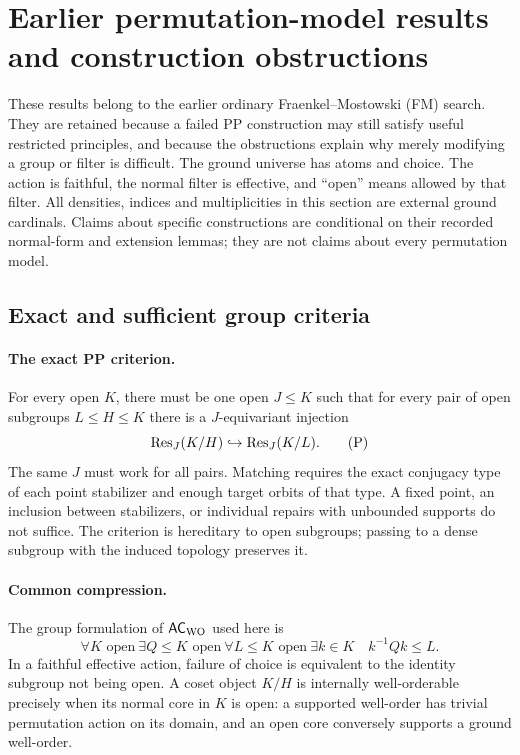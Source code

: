 \section{Earlier permutation-model results and construction obstructions}
\label{sec:earlier}
These results belong to the earlier ordinary Fraenkel--Mostowski (FM) search. They are retained because a failed PP construction may still satisfy useful restricted principles, and because the obstructions explain why merely modifying a group or filter is difficult. The ground universe has atoms and choice. The action is faithful, the normal filter is effective, and ``open'' means allowed by that filter. All densities, indices and multiplicities in this section are external ground cardinals. Claims about specific constructions are conditional on their recorded normal-form and extension lemmas; they are not claims about every permutation model.

\subsection{Exact and sufficient group criteria}
\paragraph{The exact PP criterion.}
For every open $K$, there must be one open $J\leq K$ such that for every pair of open subgroups $L\leq H\leq K$ there is a $J$-equivariant injection
\[
\operatorname{Res}_J(K/H)\hookrightarrow\operatorname{Res}_J(K/L).
\tag{P}
\]
The same $J$ must work for all pairs. Matching requires the exact conjugacy type of each point stabilizer and enough target orbits of that type. A fixed point, an inclusion between stabilizers, or individual repairs with unbounded supports do not suffice. The criterion is hereditary to open subgroups; passing to a dense subgroup with the induced topology preserves it.

\paragraph{Common compression.}
The group formulation of $\mathsf{AC}_{\mathrm{WO}}$ used here is
\[
\forall K\text{ open}\ \exists Q\leq K\text{ open}\
\forall L\leq K\text{ open}\ \exists k\in K\quad k^{-1}Qk\leq L.
\tag{C}
\]
In a faithful effective action, failure of choice is equivalent to the identity subgroup not being open. A coset object $K/H$ is internally well-orderable precisely when its normal core in $K$ is open: a supported well-order has trivial permutation action on its domain, and an open core conversely supports a ground well-order.

